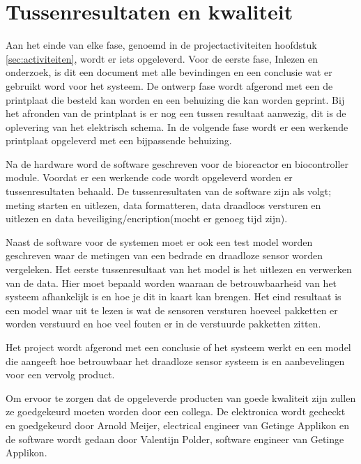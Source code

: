 \section{Tussenresultaten en kwaliteit}
Aan het einde van elke fase, genoemd in de projectactiviteiten hoofdstuk \ref{sec:activiteiten}, wordt er iets opgeleverd. Voor de eerste fase, Inlezen en onderzoek, is dit een document met alle bevindingen en een conclusie wat er gebruikt word voor het systeem. De ontwerp fase wordt afgerond met een de printplaat die besteld kan worden en een behuizing die kan worden geprint. Bij het afronden van de printplaat is er nog een tussen resultaat aanwezig, dit is de oplevering van het elektrisch schema.  In de volgende fase wordt er een werkende printplaat opgeleverd met een bijpassende behuizing. 

Na de hardware word de software geschreven voor de bioreactor en biocontroller module. Voordat er een werkende code wordt opgeleverd worden er tussenresultaten behaald. De tussenresultaten van de software zijn als volgt; meting starten en uitlezen, data formatteren, data draadloos versturen en uitlezen en data beveiliging/encription(mocht er genoeg tijd zijn).

Naast de software voor de systemen moet er ook een test model worden geschreven waar de metingen van een bedrade en draadloze sensor worden vergeleken. Het eerste tussenresultaat van het model is het uitlezen en verwerken van de data. Hier moet bepaald worden waaraan de betrouwbaarheid van het systeem afhankelijk is en hoe je dit in kaart kan brengen. Het eind resultaat is een model waar uit te lezen is wat de sensoren versturen hoeveel pakketten er worden verstuurd en hoe veel fouten er in de verstuurde pakketten zitten. 

Het project wordt afgerond met een conclusie of het systeem werkt en een model die aangeeft hoe betrouwbaar het draadloze sensor systeem is en aanbevelingen voor een vervolg product.

Om ervoor te zorgen dat de opgeleverde producten van goede kwaliteit zijn zullen ze goedgekeurd moeten worden door een collega. De elektronica wordt gecheckt en goedgekeurd door Arnold Meijer, electrical engineer van Getinge Applikon en de software wordt gedaan door Valentijn Polder, software engineer van Getinge Applikon.  